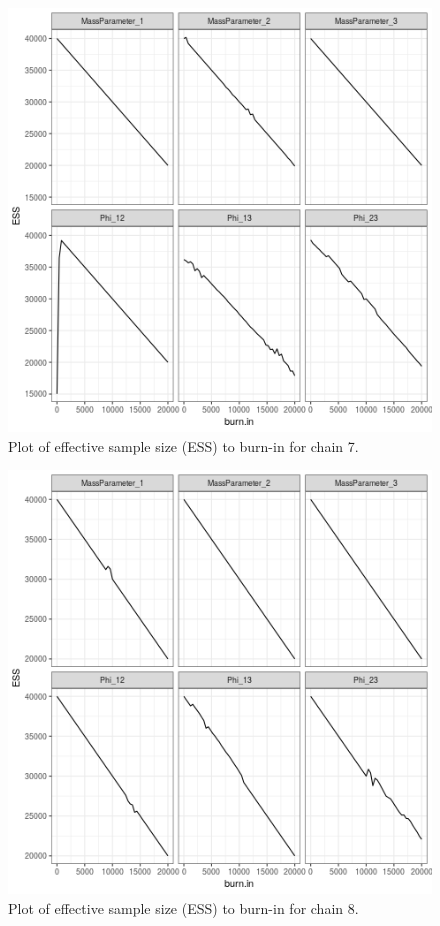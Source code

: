 \documentclass[12pt]{article} %
\begin{document}
\newpage

\begin{figure}[h]
	\centering
	\includegraphics[scale=0.65]{Images/Gen_data/Case_2/Esimated_burn_in_plot_7.png}
	\caption{Plot of effective sample size (ESS) to burn-in for chain 7.}
	\label{fig:case_2_esimated_burn_in_plot_7}
\end{figure}

\newpage

\begin{figure}[h]
	\centering
	\includegraphics[scale=0.65]{Images/Gen_data/Case_2/Esimated_burn_in_plot_8.png}
	\caption{Plot of effective sample size (ESS) to burn-in for chain 8.}
	\label{fig:case_2_esimated_burn_in_plot_8}
\end{figure}
\end{document}
